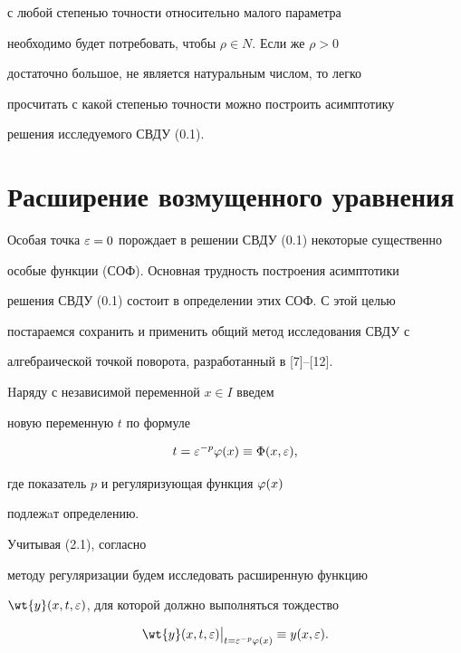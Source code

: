 с любой степенью точности относительно малого параметра


необходимо будет потребовать, чтобы $ \rho \in N $. Если же $\rho>0$


достаточно большое, не является натуральным числом, то легко


просчитать с какой степенью точности можно построить асимптотику


решения исследуемого СВДУ (0.1).





\section{Расширение возмущенного уравнения}





Особая точка $\varepsilon = 0$ порождает в решении СВДУ (0.1) некоторые существенно


особые функции (СОФ). Основная трудность построения асимптотики


решения СВДУ (0.1) состоит в определении этих СОФ. С этой целью


постараемся сохранить и применить общий метод исследования СВДУ с


алгебраической точкой поворота, разработанный в [7]--[12].





Hаряду с независимой переменной $x \in I$ введем 


новую переменную $t$ по формуле


\begin{equation}


t = \e^{-p} \f (x) \equiv \Phi (x, \e), 


\end{equation}


где показатель $p$ и регуляризующая функция $\varphi (x)$


подлежaт определению.





Учитывая (2.1), согласно


методу регуляризации будем исследовать расширенную функцию


$\wt{y} (x, t, \e)$, для которой должно выполняться тождество


\begin{equation}


\wt{y} (x, t, \e)


\big|_{t= \e^{-p} \f (x)} \equiv y(x,\e). 


\end{equation}


